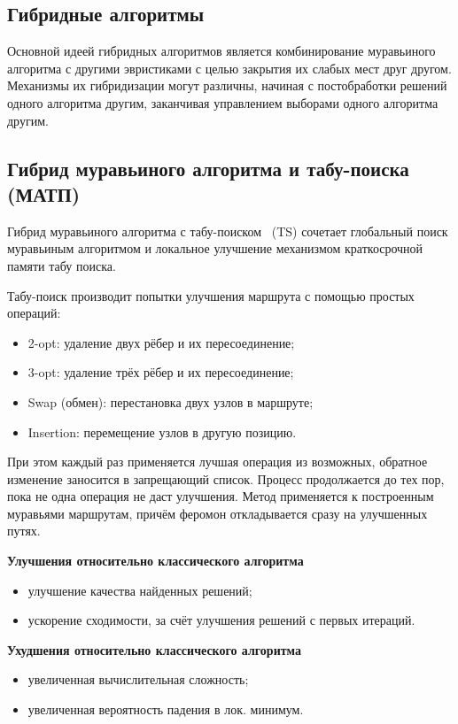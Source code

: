\subsection{Гибридные алгоритмы}

Основной идеей гибридных алгоритмов является комбинирование муравьиного алгоритма с другими эвристиками с целью закрытия их слабых мест друг другом. Механизмы их гибридизации могут различны, начиная с постобработки решений одного алгоритма другим, заканчивая управлением выборами одного алгоритма другим.

\subsection*{Гибрид муравьиного алгоритма и табу-поиска (МАТП)}

Гибрид муравьиного алгоритма с табу-поиском~\cite{aco-ts} (TS) сочетает глобальный поиск муравьиным алгоритмом и локальное улучшение механизмом краткосрочной памяти табу поиска.

Табу-поиск производит попытки улучшения маршрута с помощью простых операций:
\begin{itemize}
	\item 2-opt: удаление двух рёбер и их пересоединение;
	\item 3-opt: удаление трёх рёбер и их пересоединение;
	\item Swap (обмен): перестановка двух узлов в маршруте;
	\item Insertion: перемещение узлов в другую позицию.
\end{itemize}
При этом каждый раз применяется лучшая операция из возможных, обратное изменение заносится в запрещающий список. Процесс продолжается до тех пор, пока не одна операция не даст улучшения. Метод применяется к построенным муравьями маршрутам, причём феромон откладывается сразу на улучшенных путях.

\textbf{Улучшения относительно классического алгоритма}

\begin{itemize}
	\item улучшение качества найденных решений;
	\item ускорение сходимости, за счёт улучшения решений с первых итераций.
\end{itemize}

\textbf{Ухудшения относительно классического алгоритма}

\begin{itemize}
	\item увеличенная вычислительная сложность;
	\item увеличенная вероятность падения в лок. минимум.
\end{itemize} 


